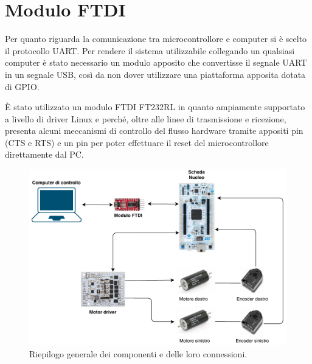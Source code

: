 \section{Modulo FTDI}
Per quanto riguarda la comunicazione tra microcontrollore e computer si è scelto il protocollo UART. 
Per rendere il sistema utilizzabile collegando un qualsiasi computer è stato necessario un modulo apposito che convertisse il segnale UART in un segnale USB, così da non dover utilizzare una piattaforma apposita dotata di GPIO.

È stato utilizzato un modulo FTDI FT232RL in quanto ampiamente supportato a livello di driver Linux e perché, oltre alle linee di trasmissione e ricezione, presenta alcuni meccanismi di controllo del flusso hardware tramite appositi pin (CTS e RTS) e un pin per poter effettuare il reset del microcontrollore direttamente dal PC.


\begin{figure}[H]
\centering
\includegraphics[width=\textwidth]{images/infrastruttura.pdf}
\caption{Riepilogo generale dei componenti e delle loro connessioni.}
\end{figure}
